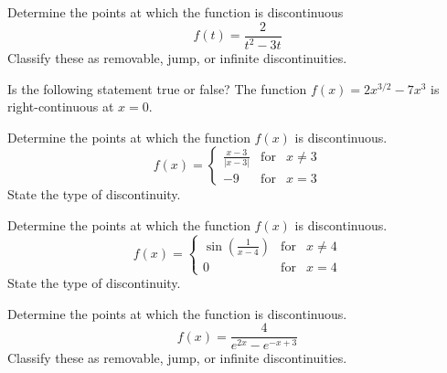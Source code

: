 \documentclass[12pt,addpoints, answers, fleqn]{exam}
\begin{document}
\begin{teacher}
\begin{questions}
Determine the points at which the function is discontinuous
\[
f\left(t\right) = \frac{2}{t^2 - 3t}
\]
Classify these as removable, jump, or infinite discontinuities.


\begin{solution}
\end{solution}

\question 	%

Is the following statement true or false?
The function $f\left(x\right) = 2x^{3/2} - 7x^3$ is right-continuous at $x = 0$.


\begin{solution}
\end{solution}

\question 	%

Determine the points at which the function $f\left(x\right)$ is discontinuous.
\[
f\left( x \right) =
\left\{
{\begin{array}{ccc}
\displaystyle \frac{x-3}{\left| x - 3 \right|} & \text{for} & x \neq 3\\[10pt]
- 9 & \text{for} & x = 3
\end{array}}
\right.
\]
State the type of discontinuity.


\begin{solution}
\end{solution}

\question 	%

Determine the points at which the function $f\left(x\right)$ is discontinuous.
\[
f\left( x \right) =
\left\{
{\begin{array}{ccc}
\displaystyle \sin \left( \frac{1}{x-4}\right) & \text{for} & x \neq 4\\[10pt]
0 & \text{for} & x = 4
\end{array}}
\right.
\]
State the type of discontinuity.


\begin{solution}
\end{solution}

\question 	%

Determine the points at which the function is discontinuous.
\[
f\left(x\right) = \frac{4}{e^{2x} - e^{-x+3}}
\]
Classify these as removable, jump, or infinite discontinuities.


\begin{solution}
\end{solution}

\question 	%


\end{questions}
\end{teacher}
\end{document}
